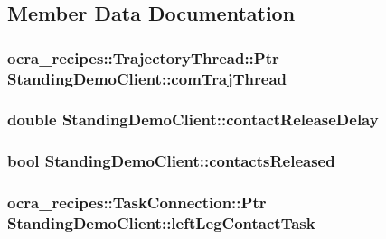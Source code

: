 \subsection{\-Member \-Data \-Documentation}
\hypertarget{classStandingDemoClient_a223aa634ceba696716779461ec1d3f63}{
\subsubsection[{com\-Traj\-Thread}]{\setlength{\rightskip}{0pt plus 5cm}ocra\-\_\-recipes\-::\-Trajectory\-Thread\-::\-Ptr {\bf \-Standing\-Demo\-Client\-::com\-Traj\-Thread}}}\label{classStandingDemoClient_a223aa634ceba696716779461ec1d3f63}
\hypertarget{classStandingDemoClient_a4a13f8bdbc84e3645c7a1ab69012c652}{
\subsubsection[{contact\-Release\-Delay}]{\setlength{\rightskip}{0pt plus 5cm}double {\bf \-Standing\-Demo\-Client\-::contact\-Release\-Delay}}}\label{classStandingDemoClient_a4a13f8bdbc84e3645c7a1ab69012c652}
\hypertarget{classStandingDemoClient_ac6744005797ac8071776a68b35a7da6d}{
\subsubsection[{contacts\-Released}]{\setlength{\rightskip}{0pt plus 5cm}bool {\bf \-Standing\-Demo\-Client\-::contacts\-Released}}}\label{classStandingDemoClient_ac6744005797ac8071776a68b35a7da6d}
\hypertarget{classStandingDemoClient_ad5dfa4632f03e75095c810b6ff2301b4}{
\subsubsection[{left\-Leg\-Contact\-Task}]{\setlength{\rightskip}{0pt plus 5cm}ocra\-\_\-recipes\-::\-Task\-Connection\-::\-Ptr {\bf \-Standing\-Demo\-Client\-::left\-Leg\-Contact\-Task}}}\label{classStandingDemoClient_ad5dfa4632f03e75095c810b6ff2301b4}
